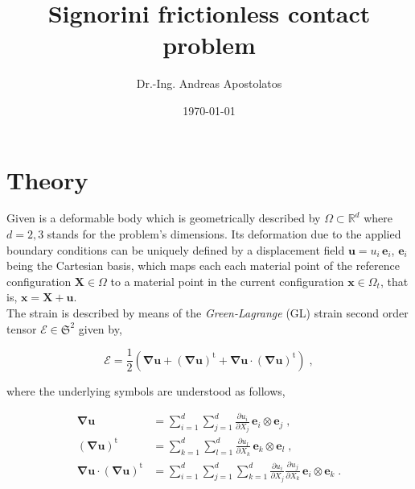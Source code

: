 \documentclass[10pt,a4paper]{article}
\title{Signorini frictionless contact problem}
\author{Dr.-Ing. Andreas Apostolatos}
\date{\today}
\begin{document}
\maketitle

\section{Theory}\label{sec:variational_formulation}

Given is a deformable body which is geometrically described by $\Omega \subset \mathbb{R}^d$ where $d = 2,3$ stands for the problem's dimensions. Its deformation due to the applied boundary conditions can be uniquely defined by a displacement field $\mathbf{u} = u_i \, \mathbf{e}_i$, $\mathbf{e}_i$ being the Cartesian basis, which maps each each material point of the reference configuration $\mathbf{X} \in \Omega$ to a material point in the current configuration $\mathbf{x} \in \Omega_t$, that is, $\mathbf{x} = \mathbf{X} + \mathbf{u}$.\\

The strain is described by means of the \textit{Green-Lagrange} (GL) strain second order tensor $\boldsymbol{\mathcal{E}} \in \mathfrak{S}^2$ given by,

\begin{equation}
	\boldsymbol{\mathcal{E}} = \frac{1}{2} \left( \boldsymbol{\nabla} \mathbf{u} + \left( \boldsymbol{\nabla} \mathbf{u} \right)^{\text{t}} +  \boldsymbol{\nabla} \mathbf{u} \cdot \left( \boldsymbol{\nabla} \mathbf{u} \right)^{\text{t}} \right) \;, \label{eq:GL_strain}
\end{equation}

where the underlying symbols are understood as follows,

\begin{subequations}
	\begin{alignat}{1}
		\boldsymbol{\nabla} \mathbf{u} &= \sum_{i = 1}^d \sum_{j = 1}^d \frac{\partial u_i}{\partial X_j} \, \mathbf{e}_i \otimes \mathbf{e}_j \;, \label{eq:nabla_u} \\
		\left( \boldsymbol{\nabla} \mathbf{u} \right)^{\text{t}} &= \sum_{k = 1}^d \sum_{l = 1}^d \frac{\partial u_l}{\partial X_k} \, \mathbf{e}_k \otimes \mathbf{e}_l \;, \label{eq:nabla_u_t} \\
		\boldsymbol{\nabla} \mathbf{u} \cdot \left( \boldsymbol{\nabla} \mathbf{u} \right)^{\text{t}} &= \sum_{i = 1}^d \sum_{j = 1}^d \sum_{k = 1}^d \frac{\partial u_i}{\partial X_j} \frac{\partial u_j}{\partial X_k} \, \mathbf{e}_i \otimes \mathbf{e}_k \;. \label{eq:nabla_u_times_u_t}
	\end{alignat}
\end{subequations}
\end{document}
